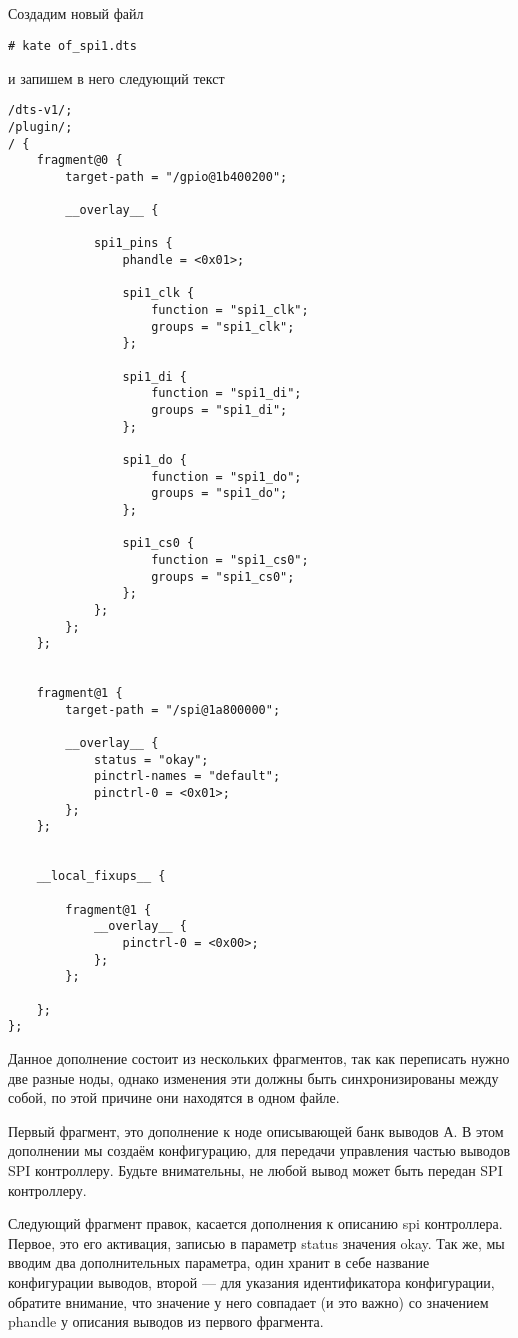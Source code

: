 \subsection{}Создадим новый файл
\begin{lstlisting}[style=bash]
# kate of_spi1.dts
\end{lstlisting}
и запишем в него следующий текст
\begin{lstlisting}[style=stdout]
/dts-v1/;
/plugin/;
/ {
	fragment@0 {
		target-path = "/gpio@1b400200";
		
		__overlay__ {
			
			spi1_pins {
				phandle = <0x01>;
				
				spi1_clk {
					function = "spi1_clk";
					groups = "spi1_clk";
				};
				
				spi1_di {
					function = "spi1_di";
					groups = "spi1_di";
				};
				
				spi1_do {
					function = "spi1_do";
					groups = "spi1_do";
				};
				
				spi1_cs0 {
					function = "spi1_cs0";
					groups = "spi1_cs0";
				};
			};
		};
	};
	
	
	fragment@1 { 
		target-path = "/spi@1a800000"; 
		
		__overlay__ { 
			status = "okay"; 
			pinctrl-names = "default"; 
			pinctrl-0 = <0x01>; 
		}; 
	}; 
	
	
	__local_fixups__ {
		
		fragment@1 {
			__overlay__ {
				pinctrl-0 = <0x00>;
			};
		};
		
	};
};
\end{lstlisting}

Данное дополнение состоит из нескольких фрагментов, так как переписать нужно две разные ноды, однако изменения эти должны быть синхронизированы между собой, по этой причине они находятся в одном файле. 

Первый фрагмент, это дополнение к ноде описывающей банк выводов А. В этом дополнении мы создаём конфигурацию, для передачи управления частью выводов SPI контроллеру. Будьте внимательны, не любой вывод может быть передан SPI контроллеру. 

Следующий фрагмент правок, касается дополнения к описанию spi контроллера. Первое, это его активация, записью в параметр status значения okay. Так же, мы вводим два дополнительных параметра, один хранит в себе название конфигурации выводов, второй — для указания идентификатора конфигурации, обратите внимание, что значение у него совпадает (и это важно) со значением phandle у описания выводов из первого фрагмента.

